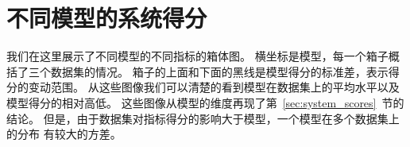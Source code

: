 
\chapter{不同模型的系统得分}\label{ch:model_system_dist}
我们在这里展示了不同模型的不同指标的箱体图。
横坐标是模型，每一个箱子概括了三个数据集的情况。
箱子的上面和下面的黑线是模型得分的标准差，表示得分的变动范围。
从这些图像我们可以清楚的看到模型在数据集上的平均水平以及模型得分的相对高低。
这些图像从模型的维度再现了第~\ref{sec:system_scores}~节的结论。
但是，由于数据集对指标得分的影响大于模型，一个模型在多个数据集上的分布
有较大的方差。





